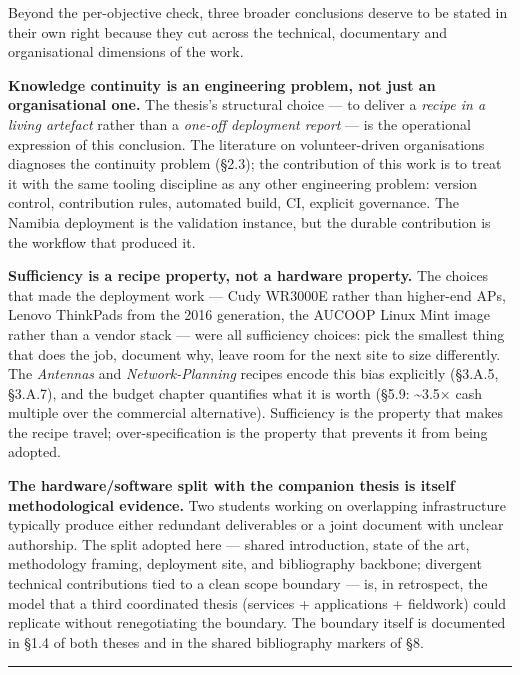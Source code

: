 Beyond the per-objective check, three broader conclusions deserve to be
stated in their own right because they cut across the technical,
documentary and organisational dimensions of the work.

\textbf{Knowledge continuity is an engineering problem, not just an
organisational one.} The thesis's structural choice --- to deliver a
\emph{recipe in a living artefact} rather than a \emph{one-off
deployment report} --- is the operational expression of this conclusion.
The literature on volunteer-driven organisations diagnoses the
continuity problem (§2.3); the contribution of this work is to treat it
with the same tooling discipline as any other engineering problem:
version control, contribution rules, automated build, CI, explicit
governance. The Namibia deployment is the validation instance, but the
durable contribution is the workflow that produced it.

\textbf{Sufficiency is a recipe property, not a hardware property.} The
choices that made the deployment work --- Cudy WR3000E rather than
higher-end APs, Lenovo ThinkPads from the 2016 generation, the AUCOOP
Linux Mint image rather than a vendor stack --- were all sufficiency
choices: pick the smallest thing that does the job, document why, leave
room for the next site to size differently. The \emph{Antennas} and
\emph{Network-Planning} recipes encode this bias explicitly (§3.A.5,
§3.A.7), and the budget chapter quantifies what it is worth (§5.9:
\textasciitilde3.5× cash multiple over the commercial alternative).
Sufficiency is the property that makes the recipe travel;
over-specification is the property that prevents it from being adopted.

\textbf{The hardware/software split with the companion thesis is itself
methodological evidence.} Two students working on overlapping
infrastructure typically produce either redundant deliverables or a
joint document with unclear authorship. The split adopted here ---
shared introduction, state of the art, methodology framing, deployment
site, and bibliography backbone; divergent technical contributions tied
to a clean scope boundary --- is, in retrospect, the model that a third
coordinated thesis (services + applications + fieldwork) could replicate
without renegotiating the boundary. The boundary itself is documented in
§1.4 of both theses and in the shared bibliography markers of §8.

\begin{center}\rule{0.5\linewidth}{0.5pt}\end{center}

